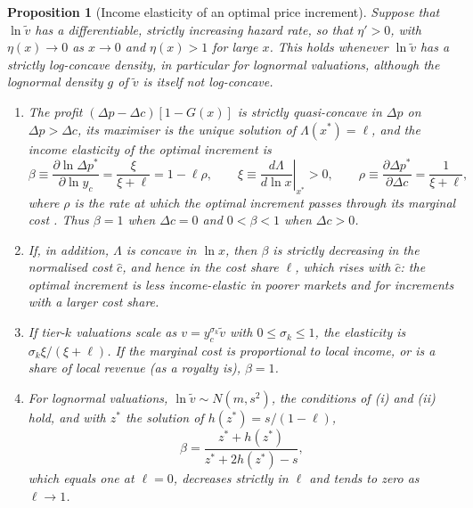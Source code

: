 \documentclass[11pt]{article}
\newtheorem{aproposition}{Proposition}[section]
\theoremstyle{definition}
\theoremstyle{remark}
\begin{document}
\begin{aproposition}[Income elasticity of an optimal price increment]\label{prop:supply}
Suppose that $\ln\tilde v$ has a differentiable, strictly increasing hazard rate, so that $\eta'>0$, with $\eta(x)\to0$ as $x\to0$ and $\eta(x)>1$ for large $x$. This holds whenever $\ln\tilde v$ has a strictly log-concave density, in particular for lognormal valuations, although the lognormal density $g$ of $\tilde v$ is itself not log-concave.
\begin{enumerate}[label=(\roman*),leftmargin=*]
\item The profit $(\Delta p-\Delta c)[1-G(x)]$ is strictly quasi-concave in $\Delta p$ on $\Delta p>\Delta c$, its maximiser is the unique solution of $\Lambda(x^*)=\ell$, and the income elasticity of the optimal increment is
\begin{equation}
 \beta\equiv\frac{\partial\ln\Delta p^*}{\partial\ln y_c}=\frac{\xi}{\xi+\ell}=1-\ell\rho,\qquad \xi\equiv\left.\frac{d\Lambda}{d\ln x}\right|_{x^*}>0,\qquad \rho\equiv\frac{\partial\Delta p^*}{\partial\Delta c}=\frac{1}{\xi+\ell},
 \label{eq:beta_supply_app}
\end{equation}
where $\rho$ is the rate at which the optimal increment passes through its marginal cost \citep{weyl2013passthrough}. Thus $\beta=1$ when $\Delta c=0$ and $0<\beta<1$ when $\Delta c>0$.
\item If, in addition, $\Lambda$ is concave in $\ln x$, then $\beta$ is strictly decreasing in the normalised cost $\hat c$, and hence in the cost share $\ell$, which rises with $\hat c$: the optimal increment is less income-elastic in poorer markets and for increments with a larger cost share.
\item If tier-$k$ valuations scale as $v=y_c^{\sigma_k}\tilde v$ with $0\le\sigma_k\le1$, the elasticity is $\sigma_k\xi/(\xi+\ell)$. If the marginal cost is proportional to local income, or is a share of local revenue (as a royalty is), $\beta=1$.
\item For lognormal valuations, $\ln\tilde v\sim N(m,s^2)$, the conditions of (i) and (ii) hold, and with $z^*$ the solution of $h(z^*)=s/(1-\ell)$,
\begin{equation}
 \beta=\frac{z^*+h(z^*)}{z^*+2h(z^*)-s},
 \label{eq:beta_lognormal}
\end{equation}
which equals one at $\ell=0$, decreases strictly in $\ell$ and tends to zero as $\ell\to1$.
\end{enumerate}
\end{aproposition}
\end{document}
